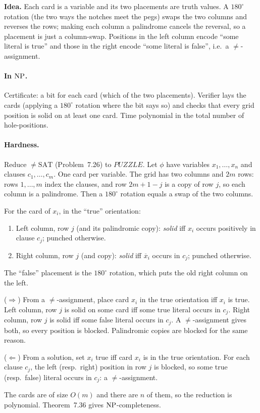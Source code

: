 \begin{soln}
\textbf{Idea.} Each card is a variable and its two placements are truth values. A $180^\circ$ rotation (the two ways the notches meet the pegs) swaps the two columns and reverses the rows; making each column a palindrome cancels the reversal, so a placement is just a column-swap. Positions in the left column encode ``some literal is true'' and those in the right encode ``some literal is false'', i.e.\ a $\neq$-assignment.



\paragraph{In $\mathrm{NP}$.}
Certificate: a bit for each card (which of the two placements). Verifier lays the cards (applying a $180^\circ$ rotation where the bit says so) and checks that every grid position is solid on at least one card. Time polynomial in the total number of hole-positions.

\paragraph{Hardness.}
Reduce $\neq\mathrm{SAT}$ (Problem~7.26) to $\mathit{PUZZLE}$. Let $\phi$ have variables $x_1,\dots,x_n$ and clauses $c_1,\dots,c_m$. One card per variable. The grid has two columns and $2m$ rows: rows $1,\dots,m$ index the clauses, and row $2m+1-j$ is a copy of row $j$, so each column is a palindrome. Then a $180^\circ$ rotation equals a swap of the two columns.

For the card of $x_i$, in the ``true'' orientation:
\begin{enumerate}
\item Left column, row $j$ (and its palindromic copy): \emph{solid} iff $x_i$ occurs positively in clause $c_j$; punched otherwise.
\item Right column, row $j$ (and copy): \emph{solid} iff $\overline{x}_i$ occurs in $c_j$; punched otherwise.
\end{enumerate}
The ``false'' placement is the $180^\circ$ rotation, which puts the old right column on the left.

($\Rightarrow$) From a $\neq$-assignment, place card $x_i$ in the true orientation iff $x_i$ is true. Left column, row $j$ is solid on some card iff some true literal occurs in $c_j$. Right column, row $j$ is solid iff some false literal occurs in $c_j$. A $\neq$-assignment gives both, so every position is blocked. Palindromic copies are blocked for the same reason.

($\Leftarrow$) From a solution, set $x_i$ true iff card $x_i$ is in the true orientation. For each clause $c_j$, the left (resp.\ right) position in row $j$ is blocked, so some true (resp.\ false) literal occurs in $c_j$: a $\neq$-assignment.

The cards are of size $O(m)$ and there are $n$ of them, so the reduction is polynomial. Theorem~7.36 gives $\mathrm{NP}$-completeness.
\end{soln}

